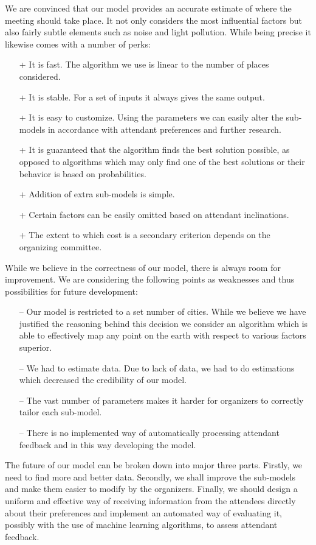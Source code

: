 
We are convinced that our model provides an accurate estimate of where the meeting should take place. It not only considers the most influential factors but also fairly subtle elements such as noise and light pollution. While being precise it likewise comes with a number of perks:  

\begin{itemize}[noitemsep,topsep=0pt,parsep=0pt,partopsep=0pt]
\item[+] It is fast. The algorithm we use is linear to the number of places considered.  
\item[+] It is stable. For a set of inputs it always gives the same output.
\item[+] It is easy to customize. Using the parameters we can easily alter the sub-models in accordance with attendant preferences and further research.
\item[+] It is guaranteed that the algorithm finds the best solution possible, as opposed to algorithms which may only find one of the best solutions or their behavior is based on probabilities.
\item[+] Addition of extra sub-models is simple.
\item[+] Certain factors can be easily omitted based on attendant inclinations.
\item[+] The extent to which cost is a secondary criterion depends on the organizing committee.  
\end{itemize}

While we believe in the correctness of our model, there is always room for improvement. We are considering the following points as weaknesses and thus possibilities for future development:

\begin{itemize}[noitemsep,topsep=0pt,parsep=0pt,partopsep=0pt]
\item[--] Our model is restricted to a set number of cities. While we believe we have justified the reasoning behind this decision we consider an algorithm which is able to effectively map any point on the earth with respect to various factors superior.
\item[--] We had to estimate data. Due to lack of data, we had to do estimations which decreased the credibility of our model.
\item[--] The vast number of parameters makes it harder for organizers to correctly tailor each sub-model.
\item[--] There is no implemented way of automatically processing attendant feedback and in this way developing the model.
\end{itemize}

The future of our model can be broken down into major three parts. Firstly, we need to find more and better data. Secondly, we shall improve the sub-models and make them easier to modify by the organizers. Finally, we should design a uniform and effective way of receiving information from the attendees directly about their preferences and implement an automated way of evaluating it, possibly with the use of machine learning algorithms, to assess attendant feedback.


